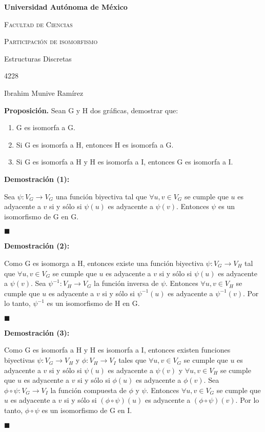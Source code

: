 \documentclass[11pt]{report}
\newcommand{\QED}{\begin{flushright}$\blacksquare$\end{flushright}}
\begin{document}
    \begin{titlepage}
        \centering
        {\bfseries\LARGE Universidad Autónoma de México\par}
        \vspace{1cm}
        {\scshape\Large Facultad de Ciencias \par}
        \vspace{1cm}
        {\scshape\Huge Participación de isomorfismo\par}
        \vspace{1cm}
        {\Large Estructuras Discretas \par}
        {\Large 4228 \par}
        {\Large Ibrahim Munive Ramírez \par}
    \end{titlepage}
    
    \textbf{Proposición.} Sean G y H dos gráficas, demostrar que:
    \begin{enumerate}
        \item G es isomorfa a G.
        \item Si G es isomorfa a H, entonces H es isomorfa a G.
        \item Si G es isomorfa a H y H es isomorfa a I, entonces G es isomorfa a I.
    \end{enumerate}
    
    \textbf{Demostración (1):}
    
    Sea $\psi: V_G \rightarrow V_G$ una función biyectiva tal que $\forall u, v \in V_G$ 
    se cumple que $u$ es adyacente a $v$ si y sólo si $\psi(u)$ es adyacente a $\psi(v)$. 
    Entonces $\psi$ es un isomorfismo de G en G.\QED
    
    \textbf{Demostración (2):}
    
    Como G es isomorga a H, entonces existe una función biyectiva $\psi: V_G \rightarrow V_H$ 
    tal que $\forall u, v \in V_G$ se cumple que $u$ es adyacente a $v$ si y sólo si $\psi(u)$ 
    es adyacente a $\psi(v)$. Sea $\psi^{-1}: V_H \rightarrow V_G$ la función inversa de $\psi$. 
    Entonces $\forall u, v \in V_H$ se cumple que $u$ es adyacente a $v$ si y sólo si $\psi^{-1}(u)$ 
    es adyacente a $\psi^{-1}(v)$. Por lo tanto, $\psi^{-1}$ es un isomorfismo de H en G.\QED
    
    \textbf{Demostración (3):}
    
    Como G es isomorfa a H y H es isomorfa a I, entonces existen funciones biyectivas $\psi :V_G\rightarrow V_H$ 
    y $\phi: V_H \rightarrow V_I$ tales que $\forall u, v \in V_G$ se cumple que $u$ es adyacente a $v$ si y sólo si 
    $\psi(u)$ es adyacente a $\psi(v)$ y $\forall u, v \in V_H$ se cumple que $u$ es adyacente a $v$ si y sólo si 
    $\phi(u)$ es adyacente a $\phi(v)$. Sea $\phi \circ \psi: V_G \rightarrow V_I$ la función compuesta de $\phi$ y $\psi$. 
    Entonces $\forall u, v \in V_G$ se cumple que $u$ es adyacente a $v$ si y sólo si $(\phi \circ \psi)(u)$ es adyacente a 
    $(\phi \circ \psi)(v)$. Por lo tanto, $\phi \circ \psi$ es un isomorfismo de G en I.\QED
    
    
\end{document}

